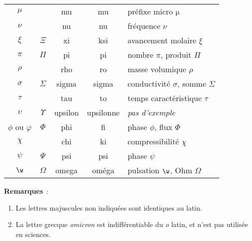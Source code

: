 \documentclass[a4paper, 12pt, garamond]{book}
\begin{document}
\begin{center}
\begin{tabular}{ccccl}
		$\mu$                       &                    & mu           & mu                     & préfixe micro $\mathrm{\mu}$           \\
		$\nu$                       &                    & nu           & nu                     & fréquence $\nu$                        \\
		$\xi$                       & $\Xi$              & xi           & ksi                    & avancement molaire $\xi$               \\
		$\pi$                       & $\Pi$              & pi           & pi                     & nombre $\pi$, produit $\Pi$            \\
		$\rho$                      &                    & rho          & ro                     & masse volumique $\rho$                 \\
		$\sigma$                    & $\Sigma$           & sigma        & sigma                  & conductivité $\sigma$, somme $\Sigma$  \\
		$\tau$                      &                    & tau          & to                     & temps caractéristique $\tau$           \\
		$\upsilon$                  & $\Upsilon$         & upsilon      & upsilonne              & \textit{pas d'exemple}                 \\
		$\phi$ ou $\varphi$         & $\Phi$             & phi          & fi                     & phase $\phi$, flux $\Phi$              \\
		$\chi$                      &                    & chi          & ki                     & compressibilité $\chi$                 \\
		$\psi$                      & $\Psi$             & psi          & psi                    & phase $\psi$                           \\
		$\w$                        & $\Omega$           & omega        & oméga                  & pulsation $\w$, Ohm $\Omega$
		\\
		\bottomrule
	\end{tabular}
\end{center}

\textbf{Remarques}~:
\begin{enumerate}
	\item Les lettres majuscules non indiquées sont identiques au latin.
	\item La lettre grecque \textit{omicron} est indifférentiable du \textit{o}
	      latin, et n'est pas utilisée en sciences.
\end{enumerate}
\end{document}
